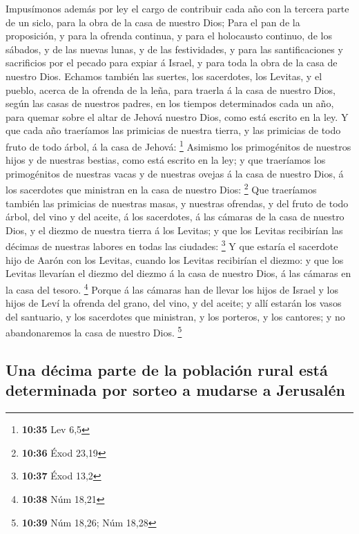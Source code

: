  Impusímonos además por ley el cargo de contribuir cada
año con la tercera parte de un siclo, para la obra de la casa de nuestro
Dios;  Para el pan de la proposición, y para la ofrenda
continua, y para el holocausto continuo, de los sábados, y de las nuevas
lunas, y de las festividades, y para las santificaciones y sacrificios
por el pecado para expiar á Israel, y para toda la obra de la casa de
nuestro Dios.  Echamos también las suertes, los
sacerdotes, los Levitas, y el pueblo, acerca de la ofrenda de la leña,
para traerla á la casa de nuestro Dios, según las casas de nuestros
padres, en los tiempos determinados cada un año, para quemar sobre el
altar de Jehová nuestro Dios, como está escrito en la ley.
 Y que cada año traeríamos las primicias de nuestra
tierra, y las primicias de todo fruto de todo árbol, á la casa de
Jehová: \footnote{\textbf{10:35} Lev 6,5}  Asimismo los
primogénitos de nuestros hijos y de nuestras bestias, como está escrito
en la ley; y que traeríamos los primogénitos de nuestras vacas y de
nuestras ovejas á la casa de nuestro Dios, á los sacerdotes que
ministran en la casa de nuestro Dios: \footnote{\textbf{10:36} Éxod
  23,19}  Que traeríamos también las primicias de
nuestras masas, y nuestras ofrendas, y del fruto de todo árbol, del vino
y del aceite, á los sacerdotes, á las cámaras de la casa de nuestro
Dios, y el diezmo de nuestra tierra á los Levitas; y que los Levitas
recibirían las décimas de nuestras labores en todas las ciudades:
\footnote{\textbf{10:37} Éxod 13,2}  Y que estaría el
sacerdote hijo de Aarón con los Levitas, cuando los Levitas recibirían
el diezmo: y que los Levitas llevarían el diezmo del diezmo á la casa de
nuestro Dios, á las cámaras en la casa del tesoro. \footnote{\textbf{10:38}
  Núm 18,21}  Porque á las cámaras han de llevar los
hijos de Israel y los hijos de Leví la ofrenda del grano, del vino, y
del aceite; y allí estarán los vasos del santuario, y los sacerdotes que
ministran, y los porteros, y los cantores; y no abandonaremos la casa de
nuestro Dios. \footnote{\textbf{10:39} Núm 18,26; Núm 18,28}

\hypertarget{una-duxe9cima-parte-de-la-poblaciuxf3n-rural-estuxe1-determinada-por-sorteo-a-mudarse-a-jerusaluxe9n}{%
\subsection{Una décima parte de la población rural está determinada por
sorteo a mudarse a
Jerusalén}\label{una-duxe9cima-parte-de-la-poblaciuxf3n-rural-estuxe1-determinada-por-sorteo-a-mudarse-a-jerusaluxe9n}}

